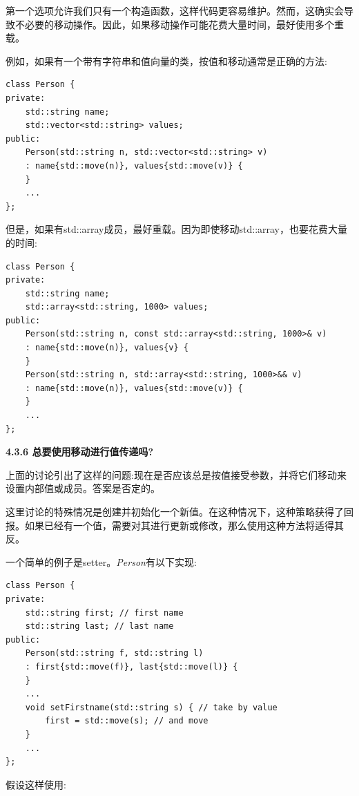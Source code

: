 第一个选项允许我们只有一个构造函数，这样代码更容易维护。然而，这确实会导致不必要的移动操作。因此，如果移动操作可能花费大量时间，最好使用多个重载。\par

例如，如果有一个带有字符串和值向量的类，按值和移动通常是正确的方法:\par

\begin{lstlisting}[caption={}]
class Person {
private:
	std::string name;
	std::vector<std::string> values;
public:
	Person(std::string n, std::vector<std::string> v)
	: name{std::move(n)}, values{std::move(v)} {
	}
	...
};
\end{lstlisting}

但是，如果有std::array成员，最好重载。因为即使移动std::array，也要花费大量的时间:\par

\begin{lstlisting}[caption={}]
class Person {
private:
	std::string name;
	std::array<std::string, 1000> values;
public:
	Person(std::string n, const std::array<std::string, 1000>& v)
	: name{std::move(n)}, values{v} {
	}
	Person(std::string n, std::array<std::string, 1000>&& v)
	: name{std::move(n)}, values{std::move(v)} {
	}
	...
};
\end{lstlisting}

\hspace*{\fill} \par %
\textbf{4.3.6 总要使用移动进行值传递吗?}

上面的讨论引出了这样的问题:现在是否应该总是按值接受参数，并将它们移动来设置内部值或成员。答案是否定的。\par

这里讨论的特殊情况是创建并初始化一个新值。在这种情况下，这种策略获得了回报。如果已经有一个值，需要对其进行更新或修改，那么使用这种方法将适得其反。\par

一个简单的例子是setter。\textit{Person}有以下实现:\par

\begin{lstlisting}[caption={}]
class Person {
private:
	std::string first; // first name
	std::string last; // last name
public:
	Person(std::string f, std::string l)
	: first{std::move(f)}, last{std::move(l)} {
	}
	...
	void setFirstname(std::string s) { // take by value
		first = std::move(s); // and move
	}
	...
};
\end{lstlisting}

假设这样使用:\par

